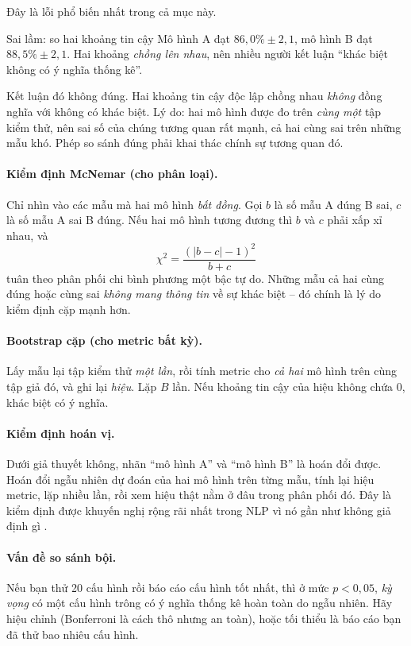 Đây là lỗi phổ biến nhất trong cả mục này.

\begin{pitfall}{Sai lầm: so hai khoảng tin cậy}
Mô hình A đạt $86{,}0\% \pm 2{,}1$, mô hình B đạt $88{,}5\% \pm 2{,}1$. Hai khoảng \emph{chồng lên nhau}, nên nhiều người kết luận “khác biệt không có ý nghĩa thống kê”.

Kết luận đó không đúng. Hai khoảng tin cậy độc lập chồng nhau \emph{không} đồng nghĩa với không có khác biệt. Lý do: hai mô hình được đo trên \emph{cùng một} tập kiểm thử, nên sai số của chúng tương quan rất mạnh, cả hai cùng sai trên những mẫu khó. Phép so sánh đúng phải khai thác chính sự tương quan đó.
\end{pitfall}

\paragraph{Kiểm định McNemar (cho phân loại).} Chỉ nhìn vào các mẫu mà hai mô hình \emph{bất đồng}. Gọi $b$ là số mẫu A đúng B sai, $c$ là số mẫu A sai B đúng. Nếu hai mô hình tương đương thì $b$ và $c$ phải xấp xỉ nhau, và
\[
\chi^2 = \frac{(|b - c| - 1)^2}{b + c}
\]
tuân theo phân phối chi bình phương một bậc tự do. Những mẫu cả hai cùng đúng hoặc cùng sai \emph{không mang thông tin} về sự khác biệt -- đó chính là lý do kiểm định cặp mạnh hơn.

\paragraph{Bootstrap cặp (cho metric bất kỳ).} Lấy mẫu lại tập kiểm thử \emph{một lần}, rồi tính metric cho \emph{cả hai} mô hình trên cùng tập giả đó, và ghi lại \emph{hiệu}. Lặp $B$ lần. Nếu khoảng tin cậy của hiệu không chứa 0, khác biệt có ý nghĩa.

\paragraph{Kiểm định hoán vị.} Dưới giả thuyết không, nhãn “mô hình A” và “mô hình B” là hoán đổi được. Hoán đổi ngẫu nhiên dự đoán của hai mô hình trên từng mẫu, tính lại hiệu metric, lặp nhiều lần, rồi xem hiệu thật nằm ở đâu trong phân phối đó. Đây là kiểm định được khuyến nghị rộng rãi nhất trong NLP vì nó gần như không giả định gì \cite{dror2018hitchhiker}.

\paragraph{Vấn đề so sánh bội.} Nếu bạn thử 20 cấu hình rồi báo cáo cấu hình tốt nhất, thì ở mức $p < 0{,}05$, \emph{kỳ vọng} có một cấu hình trông có ý nghĩa thống kê hoàn toàn do ngẫu nhiên. Hãy hiệu chỉnh (Bonferroni là cách thô nhưng an toàn), hoặc tối thiểu là báo cáo bạn đã thử bao nhiêu cấu hình.

